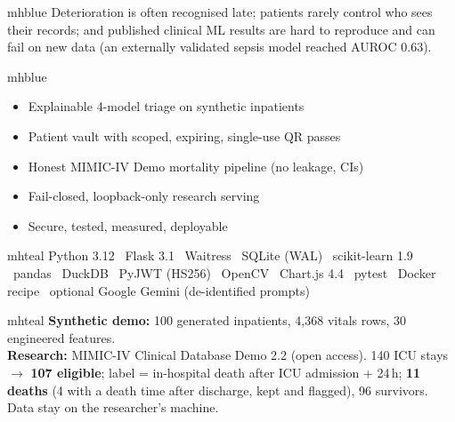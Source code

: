 \documentclass[11pt]{article}
\begin{document}
\begin{minipage}[t]{0.235\linewidth}\vspace{0pt}
\begin{pbox}[Problem]{mhblue}
Deterioration is often recognised late; patients rarely control who sees their records; and published
clinical ML results are hard to reproduce and can fail on new data (an externally validated sepsis model
reached AUROC 0.63).
\end{pbox}
\begin{pbox}[Objectives]{mhblue}
\begin{itemize}
\item Explainable 4-model triage on synthetic inpatients
\item Patient vault with scoped, expiring, single-use QR passes
\item Honest MIMIC-IV Demo mortality pipeline (no leakage, CIs)
\item Fail-closed, loopback-only research serving
\item Secure, tested, measured, deployable
\end{itemize}
\end{pbox}
\begin{pbox}{mhteal}
Python 3.12 \textbullet\ Flask 3.1 \textbullet\ Waitress \textbullet\ SQLite (WAL) \textbullet\ scikit-learn 1.9
\textbullet\ pandas \textbullet\ DuckDB \textbullet\ PyJWT (HS256) \textbullet\ OpenCV \textbullet\ Chart.js 4.4
\textbullet\ pytest \textbullet\ Docker recipe \textbullet\ optional Google Gemini (de-identified prompts)
\end{pbox}
\begin{pbox}[Data]{mhteal}
\textbf{Synthetic demo:} 100 generated inpatients, 4{,}368 vitals rows, 30 engineered features.\\
\textbf{Research:} MIMIC-IV Clinical Database Demo 2.2 (open access). 140 ICU stays $\rightarrow$
\textbf{107 eligible}; label = in-hospital death after ICU admission + 24\,h; \textbf{11 deaths}
(4 with a death time after discharge, kept and flagged), 96 survivors. Data stay on the researcher's
machine.
\end{pbox}
\end{minipage}\hfill
\end{document}
